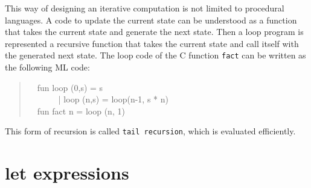 \documentclass{jbook}
\newcommand{\txt}[2]{#2}
\newcommand{\myem}{\mbox{\ \ }}
\begin{document}
	This way of designing an iterative computation is not limited to
procedural languages.
	A code to update the current state can be understood as a
function that takes the current state and generate the next state.
	Then a loop program is represented a recursive function that
takes the current state and call itself with the generated next state.
	The loop code of the C function {\tt fact} can be written as
the following ML code:
\begin{tt}
\begin{quote}
\myem  fun loop (0,s) = s\\
\myem \ \ \ \ \    | loop (n,s) = loop(n-1, s * n)\\
\myem fun fact n = loop (n, 1)
\end{quote}
\end{tt}
	This form of recursion is called {\tt tail recursion}, which is
evaluated efficiently.
\fi%

\section{\txt{let式}{let expressions}}
\label{sec:tutorialLetexpression}
\end{document}
